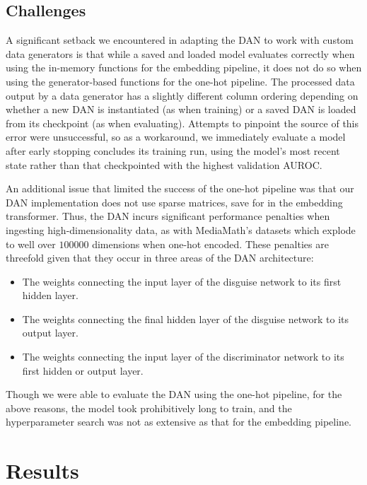 \documentclass{proc}
\begin{document}
\subsection{Challenges}

A significant setback we encountered in adapting the DAN to work with custom data generators is that while a saved and loaded model evaluates correctly when using the in-memory functions for the embedding pipeline, it does not do so when using the generator-based functions for the one-hot pipeline. The processed data output by a data generator has a slightly different column ordering depending on whether a new DAN is instantiated (as when training) or a saved DAN is loaded from its checkpoint (as when evaluating). Attempts to pinpoint the source of this error were unsuccessful, so as a workaround, we immediately evaluate a model after early stopping concludes its training run, using the model's most recent state rather than that checkpointed with the highest validation AUROC.

An additional issue that limited the success of the one-hot pipeline was that our DAN implementation does not use sparse matrices, save for in the embedding transformer. Thus, the DAN incurs significant performance penalties when ingesting high-dimensionality data, as with MediaMath's datasets which explode to well over $100000$ dimensions when one-hot encoded. These penalties are threefold given that they occur in three areas of the DAN architecture:

\begin{itemize}
    \item{The weights connecting the input layer of the disguise network to its first hidden layer.}
    \item{The weights connecting the final hidden layer of the disguise network to its output layer.}
    \item{The weights connecting the input layer of the discriminator network to its first hidden or output layer.}
\end{itemize}

Though we were able to evaluate the DAN using the one-hot pipeline, for the above reasons, the model took prohibitively long to train, and the hyperparameter search was not as extensive as that for the embedding pipeline.

\section{Results}
\end{document}

